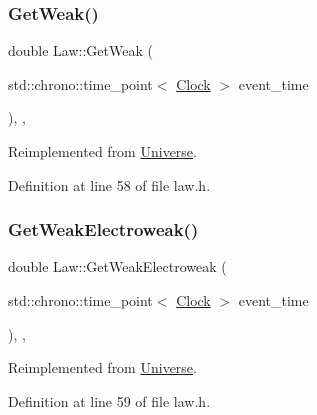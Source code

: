 \mbox{\label{class_law_a303c365b7a17997a63a74756fc72fba3}} 
\subsubsection{\texorpdfstring{Get\+Weak()}{GetWeak()}}
{\footnotesize\ttfamily double Law\+::\+Get\+Weak (\begin{DoxyParamCaption}\item[{std\+::chrono\+::time\+\_\+point$<$ \mbox{\hyperlink{universe_8h_a0ef8d951d1ca5ab3cfaf7ab4c7a6fd80}{Clock}} $>$}]{event\+\_\+time }\end{DoxyParamCaption})\hspace{0.3cm}{\ttfamily [inline]}, {\ttfamily [final]}, {\ttfamily [virtual]}}



Reimplemented from \mbox{\hyperlink{class_universe_a4476b7e0a3fc1764909f556257fd9ec7}{Universe}}.



Definition at line 58 of file law.\+h.

\mbox{\label{class_law_aad6e54da64a5d8499dcb6c232aa6748f}} 
\subsubsection{\texorpdfstring{Get\+Weak\+Electroweak()}{GetWeakElectroweak()}}
{\footnotesize\ttfamily double Law\+::\+Get\+Weak\+Electroweak (\begin{DoxyParamCaption}\item[{std\+::chrono\+::time\+\_\+point$<$ \mbox{\hyperlink{universe_8h_a0ef8d951d1ca5ab3cfaf7ab4c7a6fd80}{Clock}} $>$}]{event\+\_\+time }\end{DoxyParamCaption})\hspace{0.3cm}{\ttfamily [inline]}, {\ttfamily [final]}, {\ttfamily [virtual]}}



Reimplemented from \mbox{\hyperlink{class_universe_a645299738e6b798a037f2a15a2e7cf4d}{Universe}}.



Definition at line 59 of file law.\+h.

\mbox{\label{class_law_af99520c95b2cd8af0af110b78b2288ef}} 
